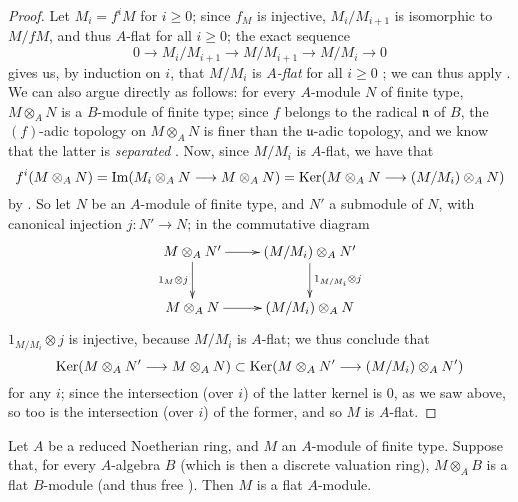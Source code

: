 \begin{proof}
Let $M_i=f^iM$ for $i\geq0$;
since $f_M$ is injective, $M_i/M_{i+1}$ is isomorphic to $M/fM$, and thus $A$-flat for all $i\geq0$;
the exact sequence
\[
  0\to M_i/M_{i+1}\to M/M_{i+1}\to M/M_i\to 0
\]
gives us, by induction on $i$, that $M/M_i$ is \emph{$A$-flat} for all $i\geq0$ ;
we can thus apply .
We can also argue directly as follows:
for every $A$-module $N$ of finite type, $M\otimes_A N$ is a $B$-module of finite type;
since $f$ belongs to the radical $\mathfrak{n}$ of $B$, the $(f)$-adic topology on $M\otimes_A N$ is finer than the
$\mathfrak{u}$-adic topology, and we know that the latter is \emph{separated} \sref[0\textsubscript{I},0.7.3.5].
Now, since $M/M_i$ is $A$-flat, we have that
\[
  f^i(M\otimes_A N)=\Im(M_i\otimes_A N\to M\otimes_A N)=\Ker(M\otimes_A N\to(M/M_i)\otimes_A N)
\]
by .
So let $N$ be an $A$-module of finite type, and $N'$ a submodule of $N$, with canonical injection $j:N'\to N$; in the commutative diagram
\[
  \xymatrix{
    M\otimes_A N'\ar[r]\ar[d]_{1_M\otimes j} &
    (M/M_i)\otimes_A N'\ar[d]^{1_{M/M_i}\otimes j}\\
    M\otimes_A N\ar[r] &
    (M/M_i)\otimes_A N
  }
\]
$1_{M/M_i}\otimes j$ is injective, because $M/M_i$ is $A$-flat; we thus conclude that
\[
  \Ker(M\otimes_A N'\to M\otimes_A N)\subset\Ker(M\otimes_A N'\to(M/M_i)\otimes_A N')
\]
for any $i$; since the intersection (over $i$) of the latter kernel is $0$, as we saw above, so too is the intersection (over $i$) of the former, and so $M$ is $A$-flat.
\end{proof}

\begin{proposition}[10.2.8]
\label{0.10.2.8}
Let $A$ be a reduced Noetherian ring, and $M$ an $A$-module of finite type.
Suppose that, for every $A$-algebra $B$ (which is then a discrete valuation ring), $M\otimes_A B$ is a flat $B$-module (and thus free ).
Then $M$ is a flat $A$-module.
\end{proposition}

